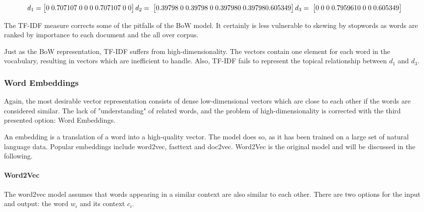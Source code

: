                 \[d_1 = \begin{bmatrix} 0\;	0.707107\;	0\;	0\;	0\;	0.707107\;	0\;	0 \end{bmatrix}	 \\
                d_2 =  \;\begin{bmatrix} 0.39798\;	0\;	0.39798\;	0\;	0.39798	0\;	0.39798	0.605349 \end{bmatrix} \\
                d_3 = \;\begin{bmatrix} 0\;	0\;	0\;	0.795961	0\;	0\;	0\;	0.605349 \end{bmatrix} \]
                
            The \ac{TF-IDF} measure corrects some of the pitfalls of the \ac{BoW} model. It certainly is less vulnerable to skewing by stopwords as words are ranked by importance to each document and the all over corpus. 
            
            Just as the \ac{BoW} representation, \ac{TF-IDF} suffers from high-dimensionality. The vectors contain one element for each word in the vocabulary, resulting in vectors which are inefficient to handle.
            Also, \ac{TF-IDF} fails to represent the topical relationship between $ d_{1} $ and $ d_{3}$. 
            
            \subsubsection{Word Embeddings}
             Again, the most desirable vector representation consists of dense low-dimensional vectors which are close to each other if the words are considered similar. The lack of "understanding" of related words, and the problem of high-dimensionality is corrected with the third presented option: Word Embeddings.
            
            An embedding is a translation of a word into a high-quality vector. The model does so, as it has been trained on a large set of natural language data. Popular embeddings include word2vec, fasttext and doc2vec. Word2Vec is the original model and will be discussed in the following. 
            
            \paragraph{Word2Vec}
            The word2vec model assumes that words appearing in a similar context are also similar to each other. There are two options for the input and output: the word $w_i$ and its context $c_i$.
            
